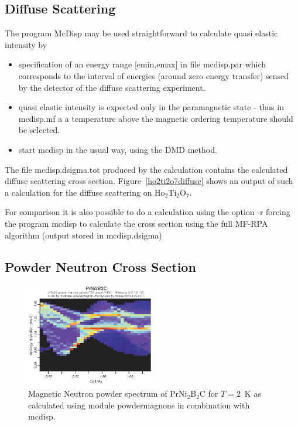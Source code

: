 \subsection{Diffuse Scattering}

The program {\prg McDisp} may be used straightforward to calculate quasi elastic intensity
 by

\begin{itemize}
\item
 specification of an energy
range [emin,emax] in file {\prg mcdisp.par} which corresponds to the interval of energies (around zero
energy transfer) sensed by the detector of the diffuse scattering experiment. 
\item
 quasi elastic intensity is expected only in the paramagnetic state - thus in {\prg mcdisp.mf} a
 a temperature above the magnetic ordering temperature should be selected.
\item start {\prg mcdisp} in the usual way, using the DMD method.
\end{itemize} 
 
The file {\prg mcdisp.dsigma.tot} produced by the calculation contains the calculated diffuse scattering cross section.
Figure~\ref{ho2ti2o7diffuse} shows an output of such a calculation for the diffuse scattering
on Ho$_2$Ti$_2$O$_7$.

For comparison it is also possible to do a calculation using the option {\prg -r} forcing
 the program {\prg mcdisp} to calculate the cross section
 using the full MF-RPA algorithm (output stored in {\prg mcdisp.dsigma})

\subsection{Powder Neutron Cross Section}


\begin{figure}[tb]%
\begin{center}\leavevmode
\includegraphics[angle=0, width=0.5\textwidth]{figsrc/contour2K_070504.eps}
\end{center}
\caption{Magnetic Neutron powder spectrum of PrNi$_2$B$_2$C for $T=2$~K as calculated using module {\prg powdermagnons} %
in combination with {\prg 
mcdisp}.}\label{prni2b2c_2K}
\end{figure}

